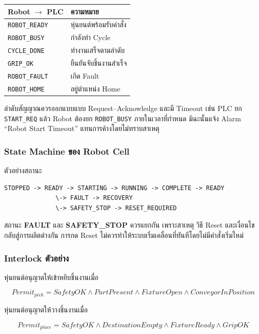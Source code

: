 \begin{table}[htbp]
    \centering
    \begin{tabular}{l l}
        \hline
        \textbf{Robot \(\rightarrow\) PLC} & \textbf{ความหมาย} \\
        \hline
        \texttt{ROBOT\_READY} & หุ่นยนต์พร้อมรับคำสั่ง \\
        \texttt{ROBOT\_BUSY} & กำลังทำ Cycle \\
        \texttt{CYCLE\_DONE} & ทำงานเสร็จตามลำดับ \\
        \texttt{GRIP\_OK} & ยืนยันจับชิ้นงานสำเร็จ \\
        \texttt{ROBOT\_FAULT} & เกิด Fault \\
        \texttt{ROBOT\_HOME} & อยู่ตำแหน่ง Home \\
        \hline
    \end{tabular}
\end{table}

ลำดับสัญญาณควรออกแบบแบบ Request–Acknowledge และมี Timeout เช่น PLC ยก \texttt{START\_REQ} แล้ว Robot ต้องยก \texttt{ROBOT\_BUSY} ภายในเวลาที่กำหนด มิฉะนั้นแจ้ง Alarm “Robot Start Timeout” แทนการค้างโดยไม่ทราบสาเหตุ

\subsubsection{State Machine ของ Robot Cell}

ตัวอย่างสถานะ

\begin{verbatim}
STOPPED -> READY -> STARTING -> RUNNING -> COMPLETE -> READY
              \-> FAULT -> RECOVERY
              \-> SAFETY_STOP -> RESET_REQUIRED
\end{verbatim}

สถานะ \textbf{FAULT} และ \textbf{SAFETY\_STOP} ควรแยกกัน เพราะสาเหตุ วิธี Reset และเงื่อนไขกลับสู่การผลิตต่างกัน การกด Reset ไม่ควรทำให้ระบบเริ่มเคลื่อนที่ทันทีโดยไม่มีคำสั่งเริ่มใหม่

\subsubsection{Interlock ตัวอย่าง}

หุ่นยนต์อนุญาตให้เข้าหยิบชิ้นงานเมื่อ

\[
Permit_{pick}=SafetyOK\land PartPresent\land FixtureOpen\land ConveyorInPosition
\]

หุ่นยนต์อนุญาตให้วางชิ้นงานเมื่อ

\[
Permit_{place}=SafetyOK\land DestinationEmpty\land FixtureReady\land GripOK
\]

